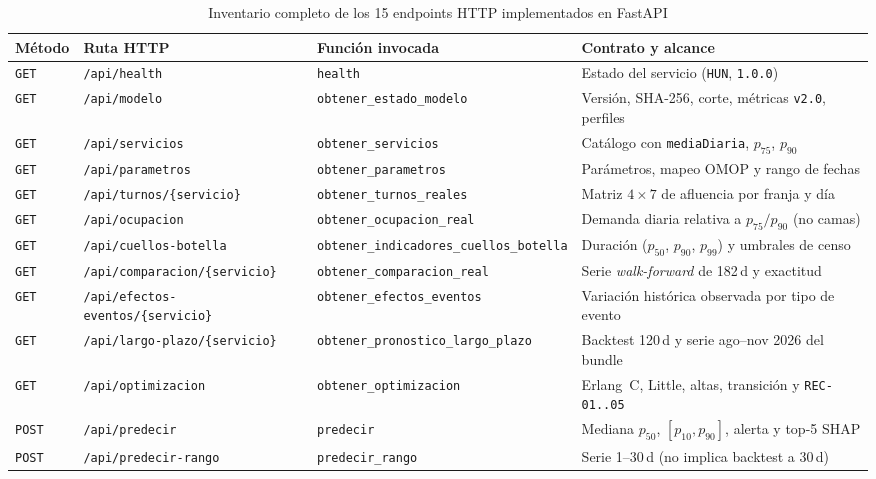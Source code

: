 \begin{table}[t]
\caption{Inventario completo de los 15 endpoints HTTP implementados en FastAPI}
\label{tab:anexo_endpoints}
\centering
\scriptsize
\begin{tabularx}{\textwidth}{@{}l L{0.28\textwidth} L{0.27\textwidth} Y@{}}
\toprule
Método & Ruta HTTP & Función invocada & Contrato y alcance \\
\midrule
\texttt{GET} & \texttt{/api/health} & \texttt{health} & Estado del servicio (\texttt{HUN}, \texttt{1.0.0}) \\
\texttt{GET} & \texttt{/api/modelo} & \texttt{obtener\_estado\_modelo} & Versión, SHA-256, corte, métricas \texttt{v2.0}, perfiles \\
\texttt{GET} & \texttt{/api/servicios} & \texttt{obtener\_servicios} & Catálogo con \texttt{mediaDiaria}, $p_{75}$, $p_{90}$ \\
\texttt{GET} & \texttt{/api/parametros} & \texttt{obtener\_parametros} & Parámetros, mapeo OMOP y rango de fechas \\
\texttt{GET} & \texttt{/api/turnos/\{servicio\}} & \texttt{obtener\_turnos\_reales} & Matriz $4\times 7$ de afluencia por franja y día \\
\texttt{GET} & \texttt{/api/ocupacion} & \texttt{obtener\_ocupacion\_real} & Demanda diaria relativa a $p_{75}/p_{90}$ (no camas) \\
\texttt{GET} & \texttt{/api/cuellos-botella} & \nolinkurl{obtener_indicadores_cuellos_botella} & Duración ($p_{50}$, $p_{90}$, $p_{99}$) y umbrales de censo \\
\texttt{GET} & \texttt{/api/comparacion/\{servicio\}} & \nolinkurl{obtener_comparacion_real} & Serie \textit{walk-forward} de 182\,d y exactitud \\
\texttt{GET} & \texttt{/api/efectos-eventos/\{servicio\}} & \nolinkurl{obtener_efectos_eventos} & Variación histórica observada por tipo de evento \\
\texttt{GET} & \texttt{/api/largo-plazo/\{servicio\}} & \nolinkurl{obtener_pronostico_largo_plazo} & Backtest 120\,d y serie ago--nov 2026 del bundle \\
\texttt{GET} & \texttt{/api/optimizacion} & \texttt{obtener\_optimizacion} & Erlang~C, Little, altas, transición y \texttt{REC-01..05} \\
\texttt{POST} & \texttt{/api/predecir} & \texttt{predecir} & Mediana $p_{50}$, $[p_{10}, p_{90}]$, alerta y top-5 SHAP \\
\texttt{POST} & \texttt{/api/predecir-rango} & \texttt{predecir\_rango} & Serie 1--30\,d (no implica backtest a 30\,d) \\

\end{tabularx}
\end{table}
